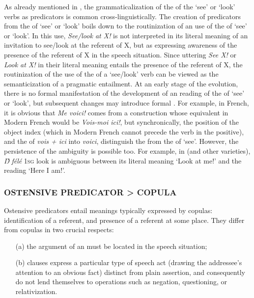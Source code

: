 \documentclass[output=paper]{langsci/langscibook}
\begin{document}
As already mentioned in , the grammaticalization of the  of the ‘see’ or ‘look’ verbs as  predicators is common cross-linguistically. 
  The creation of  predicators from the  of ‘see’ or ‘look’ boils down to the routinization of an  use of the  of ‘see’ or ‘look’. In this use, \textit{See/look at X!} is not interpreted in its literal meaning of an invitation to see\slash look at the referent of X, but as expressing awareness of the presence of the referent of X in the speech situation. Since uttering \textit{See X!} or \textit{Look at X!} in their literal meaning entails the presence of the referent of X, the routinization of the  use of the  of a ‘see\slash look’ verb can be viewed as the semanticization of a pragmatic entailment. 
  At an early stage of the evolution, there is no formal manifestation of the development of an  reading of the  of ‘see’ or ‘look’, but subsequent changes may introduce formal . For example, in French, it is obvious that \textit{Me voici!} comes from a construction whose equivalent in Modern French would be \textit{Vois-moi ici!}, but synchronically, the position of the object index (which in Modern French cannot precede the verb in the  positive), and the  of \textit{vois + ici} into \textit{voici}, distinguish the   from the  of ‘see’. However, the persistence of the ambiguity is possible too. For example, in  (and other  varieties), \textit{\'{Ŋ} félé} {\textbar}\textsc{1sg} look{\textbar} is ambiguous between its literal meaning ‘Look at me!’ and the  reading ‘Here I am!’.
  
\subsubsection{OSTENSIVE PREDICATOR > COPULA}\label{sec:creissels:6.1.2} 

Ostensive predicators entail meanings typically expressed by copulas: identification of a referent, and presence of a referent at some place. They differ from copulas in two crucial respects: 

\begin{itemize}
 \item[(a)] the argument of an   must be located in the speech situation;
\item[(b)]  clauses express a particular type of speech act (drawing the addressee’s attention to an obvious fact) distinct from plain assertion, and consequently do not lend themselves to operations such as negation, questioning, or relativization. 
\end{itemize}
\end{document}
